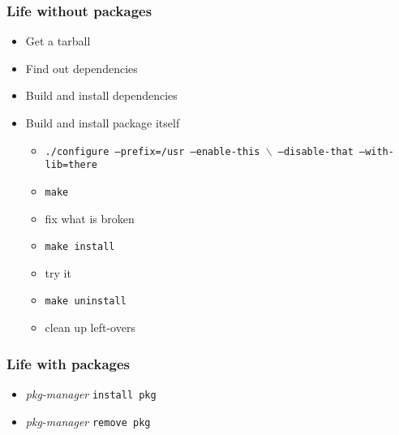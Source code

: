\begin{frame}[t]
   \frametitle{Life without packages}
   \begin{itemize}
      \item Get a tarball
      \item Find out dependencies
      \item Build and install dependencies
      \item Build and install package itself
      \begin{itemize}
         \item \texttt{./configure --prefix=/usr --enable-this \(\backslash\) \newline --disable-that --with-lib=there}
         \item \texttt{make}
         \item fix what is broken
         \item \texttt{make install}
         \item try it
         \item \texttt{make uninstall}
         \item clean up left-overs
      \end{itemize}
   \end{itemize}
\end{frame}

\begin{frame}
   \frametitle{Life with packages}
   \begin{itemize}
      \item \textit{pkg-manager} \texttt{install pkg}
      \item \textit{pkg-manager} \texttt{remove pkg}
   \end{itemize}
\end{frame}

